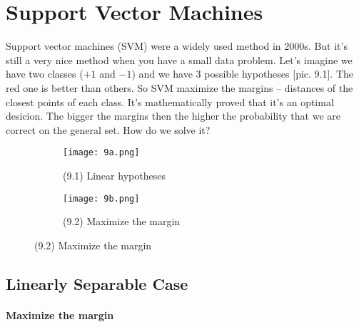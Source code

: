 \chapter{Support Vector Machines}

{\sf Support vector machines (SVM) were a widely used method in 2000s. But it's still a very nice method when you have a small data problem. Let's imagine we have two classes ($+1$ and $-1$) and we have 3 possible hypotheses [pic. 9.1]. The red one is better than others. So SVM maximize the margins -- distances of the closest points of each class. It's mathematically proved that it's an optimal desicion. The bigger the margins then the higher the probability that we are correct on the general set. How do we solve it?}
\begin{figure}[h]
  \centering
  \begin{subfigure}[c]{0.4\linewidth}
    \texttt{[image: 9a.png]}
    \caption*{(9.1) Linear hypotheses}
  \end{subfigure}
  \hspace{2cm}
  \begin{subfigure}[c]{0.35\linewidth}
    \texttt{[image: 9b.png]}
    \caption*{(9.2) Maximize the margin}
  \end{subfigure}
  \vspace{-0.4cm}
\end{figure}

\section{Linearly Separable Case}
\vspace{-0.6cm}
\subsubsection*{Maximize the margin}

